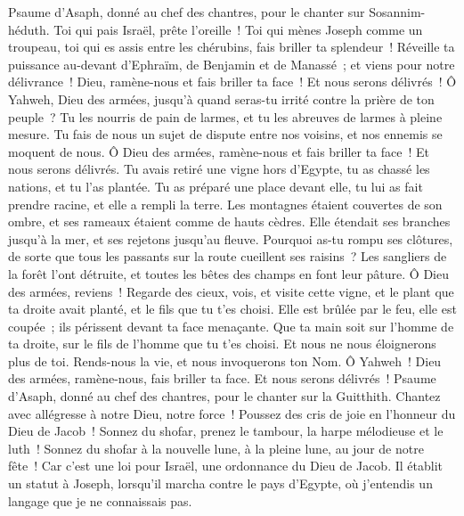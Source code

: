 \begin{multicols}{2}
\VerseOne{}Psaume d'Asaph, donné au chef des chantres, pour le chanter sur Sosannim-héduth.
Toi qui pais Israël, prête l'oreille~! Toi qui mènes Joseph comme un troupeau, toi qui es assis entre les chérubins, fais briller ta splendeur~!
Réveille ta puissance au-devant d'Ephraïm, de Benjamin et de Manassé~; et viens pour notre délivrance~!
Dieu, ramène-nous et fais briller ta face~! Et nous serons délivrés~!
Ô Yahweh, Dieu des armées, jusqu'à quand seras-tu irrité contre la prière de ton peuple~?
Tu les nourris de pain de larmes, et tu les abreuves de larmes à pleine mesure.
Tu fais de nous un sujet de dispute entre nos voisins, et nos ennemis se moquent de nous.
Ô Dieu des armées, ramène-nous et fais briller ta face~! Et nous serons délivrés.
Tu avais retiré une vigne hors d'Egypte, tu as chassé les nations, et tu l'as plantée.
Tu as préparé une place devant elle, tu lui as fait prendre racine, et elle a rempli la terre.
Les montagnes étaient couvertes de son ombre, et ses rameaux étaient comme de hauts cèdres.
Elle étendait ses branches jusqu'à la mer, et ses rejetons jusqu'au fleuve.
Pourquoi as-tu rompu ses clôtures, de sorte que tous les passants sur la route cueillent ses raisins~?
Les sangliers de la forêt l'ont détruite, et toutes les bêtes des champs en font leur pâture.
Ô Dieu des armées, reviens~! Regarde des cieux, vois, et visite cette vigne,
et le plant que ta droite avait planté, et le fils que tu t'es choisi.
Elle est brûlée par le feu, elle est coupée~; ils périssent devant ta face menaçante.
Que ta main soit sur l'homme de ta droite, sur le fils de l'homme que tu t'es choisi.
Et nous ne nous éloignerons plus de toi. Rends-nous la vie, et nous invoquerons ton Nom.
Ô Yahweh~! Dieu des armées, ramène-nous, fais briller ta face. Et nous serons délivrés~!
\VerseOne{}Psaume d'Asaph, donné au chef des chantres, pour le chanter sur la Guitthith.
Chantez avec allégresse à notre Dieu, notre force~! Poussez des cris de joie en l'honneur du Dieu de Jacob~!
Sonnez du shofar, prenez le tambour, la harpe mélodieuse et le luth~!
Sonnez du shofar à la nouvelle lune, à la pleine lune, au jour de notre fête~!
Car c'est une loi pour Israël, une ordonnance du Dieu de Jacob.
Il établit un statut à Joseph, lorsqu'il marcha contre le pays d'Egypte, où j'entendis un langage que je ne connaissais pas.

\end{multicols}
